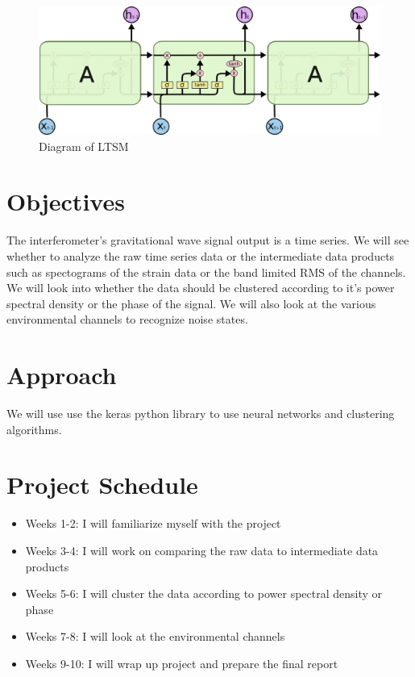 \documentclass[colorlinks=true,pdfstartview=FitV,linkcolor=blue,
            citecolor=red,urlcolor=magenta]{ligodoc}
\begin{document}
\begin{figure}[htbp]
\begin{center}
\includegraphics[width=6in]{ltsm.png}
\caption{Diagram of LTSM}
\label{fig:image2}
\end{center}
\end{figure}   

\section{Objectives}  
The interferometer's gravitational wave signal output is a time series. We will see whether to analyze the raw time series data or the 
intermediate data products such as spectograms of the strain data or the band limited RMS of the channels. We will look into whether the data should be clustered according to it's power spectral density or the phase of the signal. We will also look at the various environmental channels to recognize noise states. 

\section{Approach}
We will use use the keras python library to use neural networks and clustering algorithms. 

\section{Project Schedule}

\begin{itemize}
\item Weeks 1-2: I will familiarize myself with the project
\item Weeks 3-4: I will work on comparing the raw data to intermediate data products
\item Weeks 5-6: I will cluster the data according to power spectral density or phase
\item Weeks 7-8: I will look at the environmental channels
\item Weeks 9-10: I will wrap up project and prepare the final report
\end{itemize}
\end{document}
